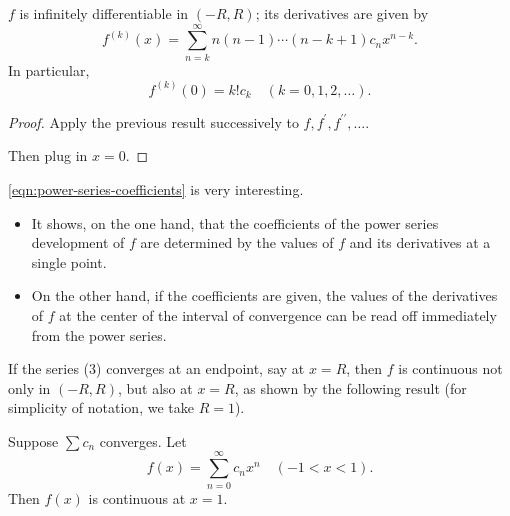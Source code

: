 \begin{corollary}
$f$ is infinitely differentiable in $(-R,R)$; its derivatives are given by
\begin{equation}
f^{(k)}(x)=\sum_{n=k}^\infty n(n-1)\cdots(n-k+1)c_n x^{n-k}.
\end{equation}
In particular,
\begin{equation}\label{eqn:power-series-coefficients}
f^{(k)}(0)=k!c_k\quad (k=0,1,2,\dots).
\end{equation}
\end{corollary}

\begin{proof}
Apply the previous result successively to $f,f^\prime,f^{\prime\prime},\dots$.

Then plug in $x=0$.
\end{proof}

\begin{remark}
\eqref{eqn:power-series-coefficients} is very interesting.
\begin{itemize}
\item It shows, on the one hand, that the coefficients of the power series development of $f$ are determined by the values of $f$ and its derivatives at a single point.
\item On the other hand, if the coefficients are given, the values of the derivatives of $f$ at the center of the interval of convergence can be read off immediately from the power series.
\end{itemize}
\end{remark}

If the series (3) converges at an endpoint, say at $x=R$, then $f$ is continuous not only in $(-R,R)$, but also at $x=R$, as shown by the following result (for simplicity of notation, we take $R=1$).

\begin{proposition}
Suppose $\sum c_n$ converges. Let
\[f(x)=\sum_{n=0}^\infty c_n x^n\quad(-1<x<1).\]
Then $f(x)$ is continuous at $x=1$.
\end{proposition}

